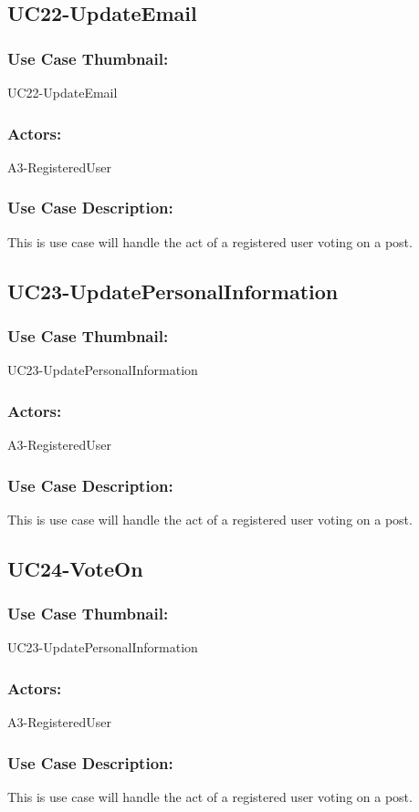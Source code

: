 \documentclass[11pt, openany]{report}
\begin{document}
\subsection{UC22-UpdateEmail}
\label{sUC22}
\subsubsection*{Use Case Thumbnail:}
UC22-UpdateEmail
\subsubsection*{Actors:}
A3-RegisteredUser
\subsubsection*{Use Case Description:}
This is use case will handle the act of a registered user voting on a post.

\subsection{UC23-UpdatePersonalInformation}
\label{sUC23}
\subsubsection*{Use Case Thumbnail:}
UC23-UpdatePersonalInformation
\subsubsection*{Actors:}
A3-RegisteredUser
\subsubsection*{Use Case Description:}
This is use case will handle the act of a registered user voting on a post.

\subsection{UC24-VoteOn}
\label{sUC24}
\subsubsection*{Use Case Thumbnail:}
UC23-UpdatePersonalInformation
\subsubsection*{Actors:}
A3-RegisteredUser
\subsubsection*{Use Case Description:}
This is use case will handle the act of a registered user voting on a post.
\end{document}
